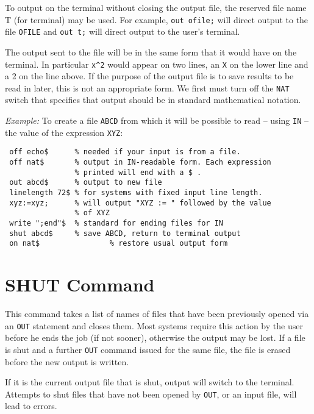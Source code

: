 To output on the terminal without closing the output file, the reserved
file name T (for terminal) may be used.  For example,
{\tt out ofile;} will direct output to the file {\tt OFILE} and
{\tt out t;} will direct output to the user's terminal.

The output sent to the file will be in the same form that it would have on
the terminal.  In particular {\tt x\verb|^|2} would appear on two lines, an
{\tt X} on the lower line and a 2 on the line above.  If the purpose of the
output file is to save results to be read in later, this is not an
appropriate form.  We first must turn off the {\tt NAT} switch that
specifies that output should be in standard mathematical notation.

{\it Example:} To create a file {\tt ABCD} from which it will be possible
to read -- using {\tt IN} -- the value of the expression {\tt XYZ}:
\begin{verbatim}
 off echo$      % needed if your input is from a file.
 off nat$       % output in IN-readable form. Each expression
                % printed will end with a $ .
 out abcd$      % output to new file
 linelength 72$ % for systems with fixed input line length.
 xyz:=xyz;      % will output "XYZ := " followed by the value
                % of XYZ
 write ";end"$  % standard for ending files for IN
 shut abcd$     % save ABCD, return to terminal output
 on nat$                % restore usual output form
\end{verbatim}

\section{SHUT Command}
This command takes a list of names of files that have been previously
opened via an {\tt OUT} statement and closes them. Most systems require this
action by the user before he ends the {\REDUCE} job (if not sooner),
otherwise the output may be lost. If a file is shut and a further {\tt OUT}
command issued for the same file, the file is erased before the new output
is written.

If it is the current output file that is shut, output will switch to the
terminal.  Attempts to shut files that have not been opened by {\tt OUT},
or an input file, will lead to errors.

